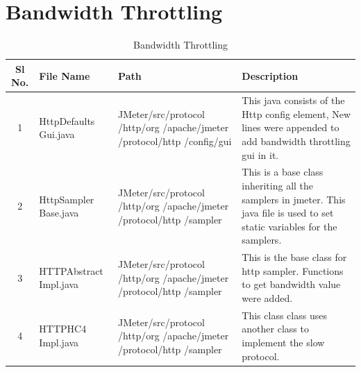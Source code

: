 \documentclass[12pt]{book}
\begin{document}
 \section{Bandwidth Throttling}
  \begin{table}[H]
  \begin{center}
   \begin{tabular}{|c|p{3cm}|p{5cm}|p{6cm}|} 
   \hline
   \textbf{Sl No.} & \textbf{File Name} & \textbf{Path} & \textbf{Description}\\
   \hline
   1 & HttpDefaults Gui.java & JMeter/src/protocol /http/org /apache/jmeter /protocol/http /config/gui &  This java consists of the Http config element, New lines were appended to add bandwidth throttling gui in  it.\\
   \hline
   2 & HttpSampler Base.java & JMeter/src/protocol /http/org /apache/jmeter /protocol/http /sampler & This is a base class inheriting all the samplers in jmeter. This java file is used to set static variables for the samplers. \\
   \hline
   3 & HTTPAbstract Impl.java & JMeter/src/protocol /http/org /apache/jmeter /protocol/http /sampler & This is the base class for http sampler. Functions to get bandwidth value were added.\\
   \hline
   4 & HTTPHC4 Impl.java & JMeter/src/protocol /http/org /apache/jmeter /protocol/http /sampler & This class class uses another class to implement the slow protocol.\\
   \hline
   \end{tabular}
   \caption{Bandwidth Throttling}
  \end{center}
 \end{table}
 
\end{document}
